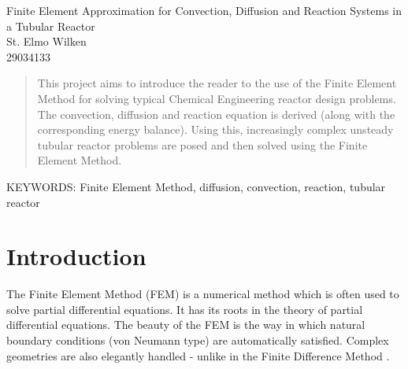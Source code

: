 \documentclass[11pt,fleqn]{article}
\theoremstyle{defstyle}
\begin{document}


\begin{center}
\Large Finite Element Approximation for Convection, Diffusion and Reaction Systems in a Tubular Reactor \\[0.5cm]
\large St. Elmo Wilken \\
29034133
\end{center}

\begin{abstract}
This project aims to introduce the reader to the use of the Finite Element Method for solving typical Chemical Engineering reactor design problems. The convection, diffusion and reaction equation is derived (along with the corresponding energy balance). Using this, increasingly complex unsteady tubular reactor problems are posed and then solved using the Finite Element Method.
\end{abstract}

\textsc{\small KEYWORDS:} \small Finite Element Method, diffusion, convection, reaction, tubular reactor
\tableofcontents
{}

\newpage
{}
\section{Introduction}
The Finite Element Method (FEM) is a numerical method which is often used to solve partial differential equations. It has its roots in the theory of partial differential equations. The beauty of the FEM is the way in which natural boundary conditions (von Neumann type) are automatically satisfied. Complex geometries are also elegantly handled - unlike in the Finite Difference Method \cite{strang}. 
\end{document}

